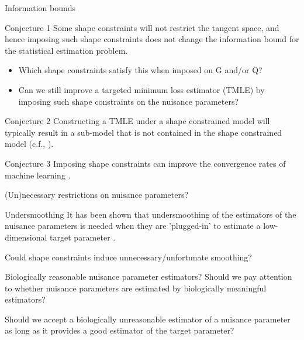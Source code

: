 \documentclass[smaller]{beamer}\usepackage{listings}
\begin{document}
\begin{frame}[label={sec:org27071e2}]{Information bounds}
\begin{alertblock}{Conjecture 1}
Some shape constraints will not restrict the tangent space, and hence
imposing such shape constraints does not change the information bound
for the statistical estimation problem.

\begin{itemize}
\item Which shape constraints satisfy this when imposed on G and/or Q?
\item Can we still improve a targeted minimum loss estimator (TMLE) by
imposing such shape constraints on the nuisance parameters?
\end{itemize}
\end{alertblock}

\begin{alertblock}{Conjecture 2}
Constructing a TMLE under a shape constrained model will typically result in a
sub-model that is not contained in the shape constrained model (c.f.,
\cite{van1989asymptotic}).
\end{alertblock}

\begin{alertblock}{Conjecture 3}
Imposing shape constraints can improve the convergence rates of machine learning
\cite[e.g.,][]{fang2021multivariate}.
\end{alertblock}
\end{frame}

\begin{frame}[label={sec:org7f12d45}]{(Un)necessary restrictions on nuisance parameters?}
\begin{block}{Undersmoothing}
It has been shown that undersmoothing of the estimators of the
nuisance parameters is needed when they are 'plugged-in' to estimate a
low-dimensional target parameter
\citep[e.g.,][]{goldstein1996efficient,hjort2001note,van2022efficient}.
\vspace{1em}

\alert{Could shape constraints induce unnecessary/unfortunate smoothing?}
\end{block}


\begin{block}{Biologically reasonable nuisance parameter estimators?}
Should we pay attention to whether nuisance parameters are estimated
by biologically meaningful estimators? \vspace{1em}

Should we accept a biologically unreasonable estimator of a nuisance parameter
as long as it provides a good estimator of the target parameter?
\end{block}
\end{frame}
\end{document}

